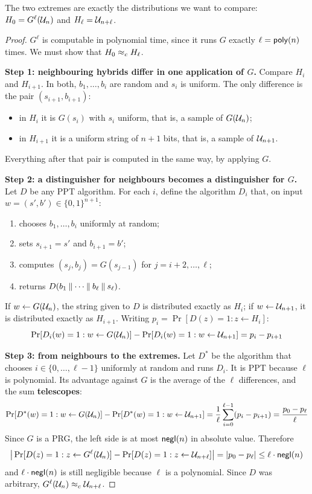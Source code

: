 The two extremes are exactly the distributions we want to compare: $H_0 = G^\ell(\mathcal{U}_{n})$ and $H_\ell = \mathcal{U}_{n+\ell}$.

\begin{proof}
  $G^\ell$ is computable in polynomial time, since it runs $G$ exactly $\ell = \mathsf{poly}(n)$ times. We must show that $H_0 \approx_c H_\ell$.

  \textbf{Step 1: neighbouring hybrids differ in one application of $G$.} Compare $H_i$ and $H_{i+1}$. In both, $b_1, \ldots, b_i$ are random and $s_i$ is uniform. The only difference is the pair $(s_{i+1}, b_{i+1})$:
  \begin{itemize}
    \item in $H_i$ it is $G(s_i)$ with $s_i$ uniform, that is, a sample of $G(\mathcal{U}_{n})$;
    \item in $H_{i+1}$ it is a uniform string of $n+1$ bits, that is, a sample of $\mathcal{U}_{n+1}$.
  \end{itemize}
  Everything after that pair is computed in the same way, by applying $G$.

  \textbf{Step 2: a distinguisher for neighbours becomes a distinguisher for $G$.} Let $D$ be any PPT algorithm. For each $i$, define the algorithm $D_i$ that, on input $w = (s', b') \in \{0,1\}^{n+1}$:
  \begin{enumerate}
    \item chooses $b_1, \ldots, b_i$ uniformly at random;
    \item sets $s_{i+1} = s'$ and $b_{i+1} = b'$;
    \item computes $(s_j, b_j) = G(s_{j-1})$ for $j = i+2, \ldots, \ell$;
    \item returns $D(b_1 \mathbin{\Vert} \cdots \mathbin{\Vert} b_\ell \mathbin{\Vert} s_\ell)$.
  \end{enumerate}
  If $w \leftarrow G(\mathcal{U}_{n})$, the string given to $D$ is distributed exactly as $H_i$; if $w \leftarrow \mathcal{U}_{n+1}$, it is distributed exactly as $H_{i+1}$. Writing $p_i = \Pr[D(z) = 1 : z \leftarrow H_i]$:
  \[
    \Pr[D_i(w) = 1 : w \leftarrow G(\mathcal{U}_{n})] - \Pr[D_i(w) = 1 : w \leftarrow \mathcal{U}_{n+1}] = p_i - p_{i+1}
  \]

  \textbf{Step 3: from neighbours to the extremes.} Let $D^*$ be the algorithm that chooses $i \in \{0, \ldots, \ell-1\}$ uniformly at random and runs $D_i$. It is PPT because $\ell$ is polynomial. Its advantage against $G$ is the average of the $\ell$ differences, and the sum \textbf{telescopes}:
  \[
    \Pr[D^*(w) = 1 : w \leftarrow G(\mathcal{U}_{n})] - \Pr[D^*(w) = 1 : w \leftarrow \mathcal{U}_{n+1}]
    = \frac{1}{\ell}\sum_{i=0}^{\ell-1} (p_i - p_{i+1}) = \frac{p_0 - p_\ell}{\ell}
  \]
  Since $G$ is a PRG, the left side is at most $\mathsf{negl}(n)$ in absolute value. Therefore
  \[
    \big|\Pr[D(z) = 1 : z \leftarrow G^\ell(\mathcal{U}_{n})] - \Pr[D(z) = 1 : z \leftarrow \mathcal{U}_{n+\ell}]\big| = |p_0 - p_\ell| \leq \ell \cdot \mathsf{negl}(n)
  \]
  and $\ell \cdot \mathsf{negl}(n)$ is still negligible because $\ell$ is a polynomial. Since $D$ was arbitrary, $G^\ell(\mathcal{U}_{n}) \approx_c \mathcal{U}_{n+\ell}$.
\end{proof}

